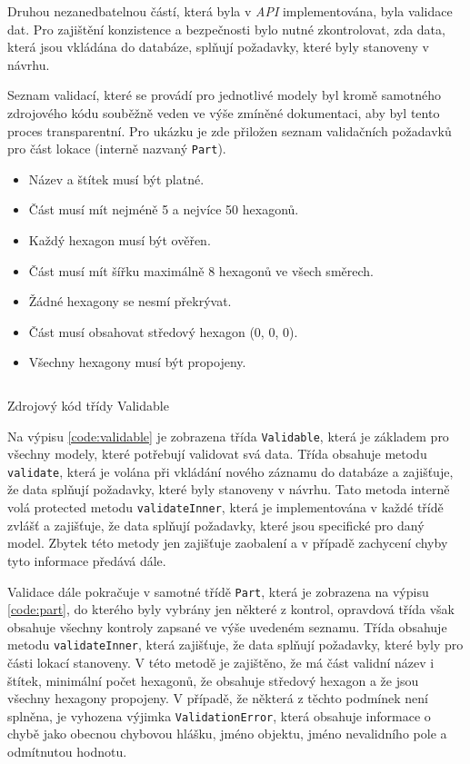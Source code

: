 Druhou nezanedbatelnou částí, která byla v \textit{API} implementována, byla validace dat. Pro zajištění konzistence a bezpečnosti bylo nutné zkontrolovat, zda data, která jsou vkládána do databáze, splňují požadavky, které byly stanoveny v návrhu.

Seznam validací, které se provádí pro jednotlivé modely byl kromě samotného zdrojového kódu souběžně veden ve výše zmíněné dokumentaci, aby byl tento proces transparentní. Pro ukázku je zde přiložen seznam validačních požadavků pro část lokace (interně nazvaný \texttt{Part}).

\begin{itemize}
    \setlength\itemsep{0.5mm}
    \item Název a štítek musí být platné.
    \item Část musí mít nejméně 5 a nejvíce 50 hexagonů.
    \item Každý hexagon musí být ověřen.
    \item Část musí mít šířku maximálně 8 hexagonů ve všech směrech.
    \item Žádné hexagony se nesmí překrývat.
    \item Část musí obsahovat středový hexagon (0, 0, 0).
    \item Všechny hexagony musí být propojeny.
\end{itemize}

\begin{listing}[h]
    \inputminted{Java}{code/Validable.java}
    \caption{Zdrojový kód třídy Validable}
    \label{code:validable}
\end{listing}

Na výpisu \ref{code:validable} je zobrazena třída \texttt{Validable}, která je základem pro všechny modely, které potřebují validovat svá data. Třída obsahuje metodu \texttt{validate}, která je volána při vkládání nového záznamu do databáze a zajišťuje, že data splňují požadavky, které byly stanoveny v návrhu. Tato metoda interně volá protected metodu \texttt{validateInner}, která je implementována v každé třídě zvlášť a zajišťuje, že data splňují požadavky, které jsou specifické pro daný model. Zbytek této metody jen zajišťuje zaobalení a v případě zachycení chyby tyto informace předává dále.

Validace dále pokračuje v samotné třídě \texttt{Part}, která je zobrazena na výpisu \ref{code:part}, do kterého byly vybrány jen některé z kontrol, opravdová třída však obsahuje všechny kontroly zapsané ve výše uvedeném seznamu. Třída obsahuje metodu \texttt{validateInner}, která zajišťuje, že data splňují požadavky, které byly pro části lokací stanoveny. V této metodě je zajištěno, že má část validní název i štítek, minimální počet hexagonů, že obsahuje středový hexagon a že jsou všechny hexagony propojeny. V případě, že některá z těchto podmínek není splněna, je vyhozena výjimka \texttt{ValidationError}, která obsahuje informace o chybě jako obecnou chybovou hlášku, jméno objektu, jméno nevalidního pole a odmítnutou hodnotu.

